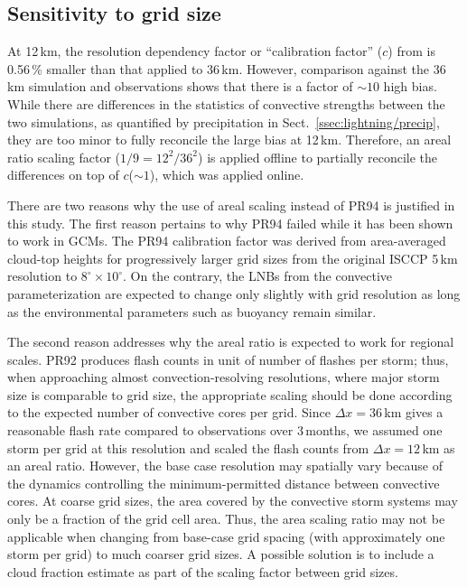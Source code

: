 \subsection{Sensitivity to grid size}\label{ssec:lightning/gridsens}

At 12\,\unit{km}, the resolution dependency factor or ``calibration factor''
($c$) from \cite{Price:1994fk} is 0.56\,{\%} smaller than that applied to
36\,\unit{km}. However, comparison against the 36\,\unit{km} simulation and
observations shows that there is a factor of $\sim10$ high bias. While there
are differences in the statistics of convective strengths between the two
simulations, as quantified by precipitation in Sect.~\ref{ssec:lightning/precip},
they are too minor to fully reconcile the large bias at 12\,\unit{km}.
Therefore, an areal ratio scaling factor ($1/9 = 12^2/36^2$) is applied
offline to partially reconcile the differences on top of $c$($\sim1$), which
was applied online.

There are two reasons why the use of areal scaling instead of PR94 is
justified in this study. The first reason pertains to why PR94 failed while
it has been shown to work in GCMs. The PR94 calibration factor was derived
from area-averaged cloud-top heights for progressively larger grid sizes from
the original ISCCP 5\,\unit{km} resolution to $8^\circ\times10^\circ$. On the
contrary, the LNBs from the convective parameterization are expected to
change only slightly with grid resolution as long as the environmental
parameters such as buoyancy remain similar.

The second reason addresses why the areal ratio is expected to work for
regional scales. PR92 produces flash counts in unit of number of flashes per
storm; thus, when approaching almost convection-resolving resolutions, where
major storm size is comparable to grid size, the appropriate scaling should
be done according to the expected number of convective cores per grid. Since
$\Delta x=36$\,\unit{km} gives a reasonable flash rate compared to
observations over 3\,months, we assumed one storm per grid at this resolution
and scaled the flash counts from $\Delta x=12$\,\unit{km} as an areal ratio.
However, the base case resolution may spatially vary because of the dynamics
controlling the minimum-permitted distance between convective cores. At
coarse grid sizes, the area covered by the convective storm systems may only
be a fraction of the grid cell area. Thus, the area scaling ratio may not be
applicable when changing from base-case grid spacing (with approximately one
storm per grid) to much coarser grid sizes. A possible solution is to include
a cloud fraction estimate as part of the scaling factor between grid sizes.

